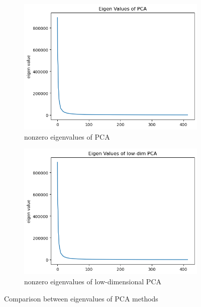 \begin{figure}
	\centering
	\begin{subfigure}[t]{0.48\linewidth}
		\centering
		\includegraphics[width=\linewidth]{image/q1_eigval_pca.png}
		\caption{nonzero eigenvalues of PCA}
		\label{fig:eigval_pca}
	\end{subfigure}%
	\hfill
	\begin{subfigure}[t]{0.48\linewidth}
		\centering
		\includegraphics[width=\linewidth]{image/q1_eigval_lowdim.png}
		\caption{nonzero eigenvalues of low-dimensional PCA}
		\label{fig:eigval_lowdim}
	\end{subfigure}
	\caption{Comparison between eigenvalues of PCA methods}
	\label{fig:q1_eigval}
\end{figure}

